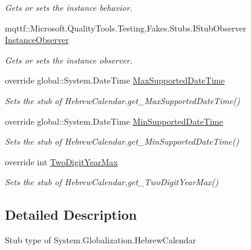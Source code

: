 \begin{DoxyCompactItemize}
\begin{DoxyCompactList}\small\item\em Gets or sets the instance behavior.\end{DoxyCompactList}\item 
mqttf\-::\-Microsoft.\-Quality\-Tools.\-Testing.\-Fakes.\-Stubs.\-I\-Stub\-Observer \hyperlink{class_system_1_1_globalization_1_1_fakes_1_1_stub_hebrew_calendar_a9fbd5bcfaa4a0c3376ba9906398ce649}{Instance\-Observer}
\begin{DoxyCompactList}\small\item\em Gets or sets the instance observer.\end{DoxyCompactList}\item 
override global\-::\-System.\-Date\-Time \hyperlink{class_system_1_1_globalization_1_1_fakes_1_1_stub_hebrew_calendar_a5cd81a193b6f0c151ccf2b8c799556dd}{Max\-Supported\-Date\-Time}
\begin{DoxyCompactList}\small\item\em Sets the stub of Hebrew\-Calendar.\-get\-\_\-\-Max\-Supported\-Date\-Time()\end{DoxyCompactList}\item 
override global\-::\-System.\-Date\-Time \hyperlink{class_system_1_1_globalization_1_1_fakes_1_1_stub_hebrew_calendar_af92f64f174b129cc78421e5bbcc5c66a}{Min\-Supported\-Date\-Time}
\begin{DoxyCompactList}\small\item\em Sets the stub of Hebrew\-Calendar.\-get\-\_\-\-Min\-Supported\-Date\-Time()\end{DoxyCompactList}\item 
override int \hyperlink{class_system_1_1_globalization_1_1_fakes_1_1_stub_hebrew_calendar_ad5f9d2b5d302daff8a712ac6a4231d67}{Two\-Digit\-Year\-Max}
\begin{DoxyCompactList}\small\item\em Sets the stub of Hebrew\-Calendar.\-get\-\_\-\-Two\-Digit\-Year\-Max()\end{DoxyCompactList}\end{DoxyCompactItemize}


\subsection{Detailed Description}
Stub type of System.\-Globalization.\-Hebrew\-Calendar



